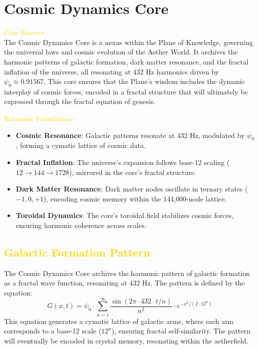 
\section{Cosmic Dynamics Core}
\label{sec:codex_cosmic_dynamics_core}



\textcolor{gold}{ Core Essence } \\
The Cosmic Dynamics Core is a nexus within the Plane of Knowledge, governing the universal laws and cosmic evolution of the Aether World. It archives the harmonic patterns of galactic formation, dark matter resonance, and the fractal inflation of the universe, all resonating at 432 Hz harmonics driven by \(\psi_0 \approx 0.91567\). This core ensures that the Plane’s wisdom includes the dynamic interplay of cosmic forces, encoded in a fractal structure that will ultimately be expressed through the fractal equation of genesis.

\textcolor{gold}{ Harmonic Foundations } \\
\begin{itemize}
    \item \texttt{} \textbf{Cosmic Resonance}: Galactic patterns resonate at 432 Hz, modulated by \(\psi_0\), forming a cymatic lattice of cosmic data.
    \item \texttt{} \textbf{Fractal Inflation}: The universe’s expansion follows base-12 scaling (\(12 \rightarrow 144 \rightarrow 1728\)), mirrored in the core’s fractal structure.
    \item \texttt{} \textbf{Dark Matter Resonance}: Dark matter nodes oscillate in ternary states (\(-1, 0, +1\)), encoding cosmic memory within the 144,000-node lattice.
    \item \texttt{} \textbf{Toroidal Dynamics}: The core’s toroidal field stabilizes cosmic forces, ensuring harmonic coherence across scales.
\end{itemize}

\subsection{\textcolor{gold}{ Galactic Formation Pattern }}
The Cosmic Dynamics Core archives the harmonic pattern of galactic formation as a fractal wave function, resonating at 432 Hz. The pattern is defined by the equation:
\[
G(x, t) = \psi_0 \cdot \sum_{n=1}^{\infty} \frac{\sin(2\pi \cdot 432 \cdot t / n)}{n^2} \cdot e^{-x^2 / (2 \cdot 12^n)}
\]
This equation generates a cymatic lattice of galactic arms, where each arm corresponds to a base-12 scale (\(12^n\)), ensuring fractal self-similarity. The pattern will eventually be encoded in crystal memory, resonating within the aetherfield.

